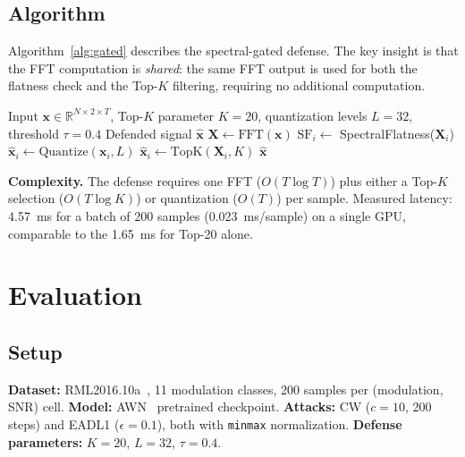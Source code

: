 \documentclass[letterpaper,twocolumn,10pt]{article}
\begin{document}
\subsection{Algorithm}

Algorithm~\ref{alg:gated} describes the spectral-gated defense.
The key insight is that the FFT computation is \emph{shared}:
the same FFT output is used for both the flatness check and the
Top-$K$ filtering, requiring no additional computation.

\begin{algorithm}[t]
\caption{Spectral-Gated Defense}
\label{alg:gated}
\begin{algorithmic}[1]
\Require Input $\mathbf{x} \in \mathbb{R}^{N \times 2 \times T}$,
  Top-$K$ parameter $K{=}20$, quantization levels $L{=}32$,
  threshold $\tau{=}0.4$
\Ensure Defended signal $\hat{\mathbf{x}}$
\State $\mathbf{X} \gets \text{FFT}(\mathbf{x})$
  \State $\text{SF}_i \gets$ SpectralFlatness($\mathbf{X}_i$)
    \State $\hat{\mathbf{x}}_i \gets \text{Quantize}(\mathbf{x}_i, L)$
  \Else
    \State $\hat{\mathbf{x}}_i \gets \text{TopK}(\mathbf{X}_i, K)$
  \EndIf
\EndFor
\State \Return $\hat{\mathbf{x}}$
\end{algorithmic}
\end{algorithm}

\textbf{Complexity.}
The defense requires one FFT ($O(T \log T)$) plus either a Top-$K$
selection ($O(T \log K)$) or quantization ($O(T)$) per sample.
Measured latency: 4.57~ms for a batch of 200 samples (0.023~ms/sample)
on a single GPU, comparable to the 1.65~ms for Top-20 alone.

\section{Evaluation}
\label{sec:eval}

\subsection{Setup}

\textbf{Dataset:} RML2016.10a~\cite{otoole2016rml}, 11 modulation
classes, 200 samples per (modulation, SNR) cell.
\textbf{Model:} AWN~\cite{li2023awn} pretrained checkpoint.
\textbf{Attacks:} CW ($c{=}10$, 200 steps) and EADL1
($\epsilon{=}0.1$), both with \texttt{minmax} normalization.
\textbf{Defense parameters:} $K{=}20$, $L{=}32$, $\tau{=}0.4$.
\end{document}
